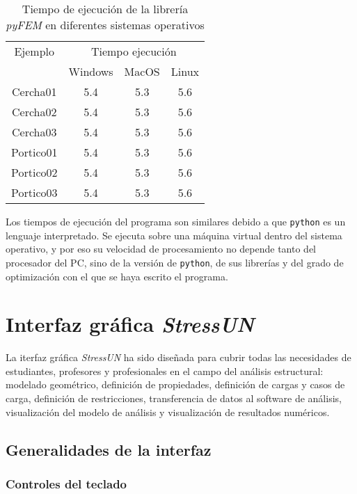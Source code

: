 \begin{table}[htbp]
    \centering
    \begin{tabular}{c|ccc}
        \hline 
        Ejemplo & \multicolumn{3}{c}{Tiempo ejecución} \\
         & Windows & MacOS & Linux \\ 
         \hline 
        Cercha01 & 5.4 & 5.3 & 5.6 \\ 
        Cercha02 & 5.4 & 5.3 & 5.6 \\ 
        Cercha03 & 5.4 & 5.3 & 5.6 \\
        Portico01 & 5.4 & 5.3 & 5.6 \\
        Portico02 & 5.4 & 5.3 & 5.6 \\
        Portico03 & 5.4 & 5.3 & 5.6 \\
        \hline 
    \end{tabular}
    \caption{Tiempo de ejecución de la librería \textit{pyFEM} en diferentes sistemas operativos}
    \label{tab:my_label}
\end{table}

Los tiempos de ejecución del programa son similares debido a que \texttt{python} es un lenguaje interpretado. Se ejecuta sobre una máquina virtual dentro del sistema operativo, y por eso su velocidad de procesamiento no depende tanto del procesador del PC, sino de la versión de \texttt{python}, de sus librerías y del grado de optimización con el que se haya escrito el programa.


\section{Interfaz gráfica \textit{StressUN}}

La iterfaz gráfica \textit{StressUN} ha sido diseñada para cubrir todas las necesidades de estudiantes, profesores y profesionales en el campo del análisis estructural: modelado geométrico, definición de propiedades, definición de cargas y casos de carga, definición de restricciones, transferencia de datos al software de análisis, visualización del modelo de análisis y visualización de resultados numéricos.

\subsection{Generalidades de la interfaz}

\subsubsection{Controles del teclado}

